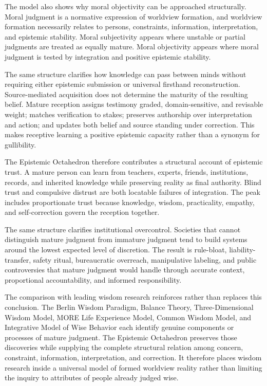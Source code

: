 \documentclass[11pt]{article}
\begin{document}
The model also shows why moral objectivity can be approached structurally. Moral judgment is a normative expression of worldview formation, and worldview formation necessarily relates to persons, constraints, information, interpretation, and epistemic stability. Moral subjectivity appears where unstable or partial judgments are treated as equally mature. Moral objectivity appears where moral judgment is tested by integration and positive epistemic stability.

The same structure clarifies how knowledge can pass between minds without requiring either epistemic submission or universal firsthand reconstruction. Source-mediated acquisition does not determine the maturity of the resulting belief. Mature reception assigns testimony graded, domain-sensitive, and revisable weight; matches verification to stakes; preserves authorship over interpretation and action; and updates both belief and source standing under correction. This makes receptive learning a positive epistemic capacity rather than a synonym for gullibility.

The Epistemic Octahedron therefore contributes a structural account of epistemic trust. A mature person can learn from teachers, experts, friends, institutions, records, and inherited knowledge while preserving reality as final authority. Blind trust and compulsive distrust are both locatable failures of integration. The peak includes proportionate trust because knowledge, wisdom, practicality, empathy, and self-correction govern the reception together.

The same structure clarifies institutional overcontrol. Societies that cannot distinguish mature judgment from immature judgment tend to build systems around the lowest expected level of discretion. The result is rule-bloat, liability-transfer, safety ritual, bureaucratic overreach, manipulative labeling, and public controversies that mature judgment would handle through accurate context, proportional accountability, and informed responsibility.

The comparison with leading wisdom research reinforces rather than replaces this conclusion. The Berlin Wisdom Paradigm, Balance Theory, Three-Dimensional Wisdom Model, MORE Life Experience Model, Common Wisdom Model, and Integrative Model of Wise Behavior each identify genuine components or processes of mature judgment. The Epistemic Octahedron preserves those discoveries while supplying the complete structural relation among concern, constraint, information, interpretation, and correction. It therefore places wisdom research inside a universal model of formed worldview reality rather than limiting the inquiry to attributes of people already judged wise.
\end{document}
